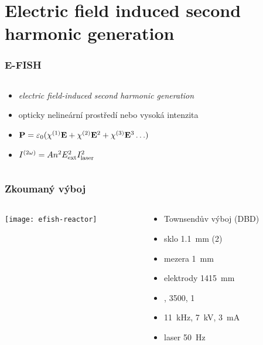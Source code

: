 \documentclass[10pt]{beamer}
\newcommand\epol{P}
\newcommand\esus{\chi}
\newcommand\esusn[1]{\esus^{(#1)}}
\newcommand\eper{\varepsilon}
\newcommand\epervac{\eper_0}
\newcommand\elfieldext{E_\text{ext}}
\newcommand\efishconst{A}
\newcommand\itylaser{I_\text{laser}}
\begin{document}
\section[E-FISH]{Electric field induced second harmonic generation}
\graphicspath{
	{../efish/}
	{img}
}

\begin{frame}
	\frametitle{E-FISH}
	\begin{columns}
	\begin{column}{0.54\textwidth}
		\begin{itemize}
			\item \emph{electric field-induced second harmonic generation}
			\item opticky nelineární prostředí nebo vysoká intenzita
			\item $\vec\epol = \epervac (\esusn1\vec\elfield + \esusn2\vec\elfield^2
				+ \esusn3\vec\elfield^3
				\ldots)$
			\item $\efish = \efishconst \ndens^2 \elfieldext^2 \itylaser^2$
		\end{itemize}
	\end{column}
	\begin{column}{0.46\textwidth}
		
	\end{column}
	\end{columns}
\end{frame}

\begin{frame}
	\frametitle{Zkoumaný výboj}
	\begin{columns}
	\begin{column}{0.6\textwidth}
		\texttt{[image: efish-reactor]}
		
	\end{column}
	\begin{column}{0.4\textwidth}
		\begin{itemize}
			\item Townsendův výboj (DBD)
			\item sklo \SI{1.1}{\milli\metre} (2\times)
			\item mezera \SI{1}{\milli\metre}
			\item elektrody \num{14}\times\SI{15}{\milli\metre}
			\item {}, \SI{3500}{\sccm}, \SI{1}{\atmosphere}
			\item \SI{11}{\kilo\hertz}, \SI{7}{\kilo\volt},
				\SI{3}{\milli\ampere}
			\item laser \SI{50}{\hertz}
		\end{itemize}
	\end{column}
	\end{columns}
\end{frame}
\end{document}

